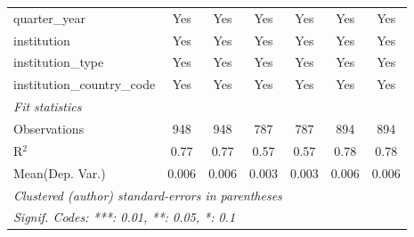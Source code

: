 \begin{tabular}{lcccccc}
   quarter\_year                      & Yes     & Yes     & Yes     & Yes     & Yes     & Yes\\  
   institution                        & Yes     & Yes     & Yes     & Yes     & Yes     & Yes\\  
   institution\_type                  & Yes     & Yes     & Yes     & Yes     & Yes     & Yes\\  
   institution\_country\_code         & Yes     & Yes     & Yes     & Yes     & Yes     & Yes\\  
   \midrule
   \emph{Fit statistics}\\
   Observations                       & 948     & 948     & 787     & 787     & 894     & 894\\  
   R$^2$                              & 0.77    & 0.77    & 0.57    & 0.57    & 0.78    & 0.78\\  
Mean(Dep. Var.) & 0.006 & 0.006 & 0.003 & 0.003 & 0.006 & 0.006 \\
   \midrule \midrule
   \multicolumn{7}{l}{\emph{Clustered (author) standard-errors in parentheses}}\\
   \multicolumn{7}{l}{\emph{Signif. Codes: ***: 0.01, **: 0.05, *: 0.1}}\\
\end{tabular}
\par\endgroup
